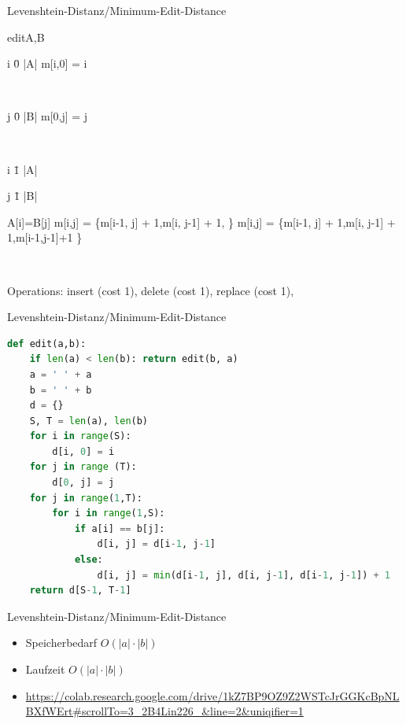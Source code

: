 \documentclass[aspectratio=169]{beamer}
\begin{document}
\begin{frame}{Levenshtein-Distanz/Minimum-Edit-Distance}
\begin{algorithm}{edit}{A,B}
\begin{FOR}
{i \= 0 \TO |A|}
m[i,0] = i
\end{FOR}\\
\begin{FOR}
{j \= 0 \TO |B|}
m[0,j] = j
\end{FOR}\\
\begin{FOR}
{i \= 1 \TO |A|}
\begin{FOR}
{j \= 1 \TO |B|}
\begin{IF}{A[i]=B[j]}
m[i,j] = \min\{m[i\mbox{-}1, j] \mbox{+} 1,m[i, j\mbox{-}1] \mbox{+} 1,  \}
\ELSE
m[i,j] = \min\{m[i\mbox{-}1, j] \mbox{+} 1,m[i, j\mbox{-}1] \mbox{+} 1,m[i\mbox{-}1,j\mbox{-}1]\mbox{+}1 \}
\end{IF}
\end{FOR}
\end{FOR}\\
\end{algorithm}
Operations: insert (cost 1), delete (cost 1), replace (cost 1), 
\end{frame}


\begin{frame}[fragile]{Levenshtein-Distanz/Minimum-Edit-Distance}
\begin{lstlisting}[language=Python]
def edit(a,b):
    if len(a) < len(b): return edit(b, a)
    a = ' ' + a
    b = ' ' + b
    d = {}
    S, T = len(a), len(b)
    for i in range(S):
        d[i, 0] = i
    for j in range (T):
        d[0, j] = j
    for j in range(1,T):
        for i in range(1,S):
            if a[i] == b[j]:
                d[i, j] = d[i-1, j-1]
            else:
                d[i, j] = min(d[i-1, j], d[i, j-1], d[i-1, j-1]) + 1
    return d[S-1, T-1]
\end{lstlisting}
\end{frame}

\begin{frame}[fragile]{Levenshtein-Distanz/Minimum-Edit-Distance}
 \begin{itemize}
    \item Speicherbedarf $O(|a|\cdot|b|)$
    \item Laufzeit $O(|a|\cdot|b|)$
    \item \url{https://colab.research.google.com/drive/1kZ7BP9OZ9Z2WSTcJrGGKcBpNLBXfWErt#scrollTo=3_2B4Lin226_&line=2&uniqifier=1}
\end{itemize}
\end{frame}
\end{document}
